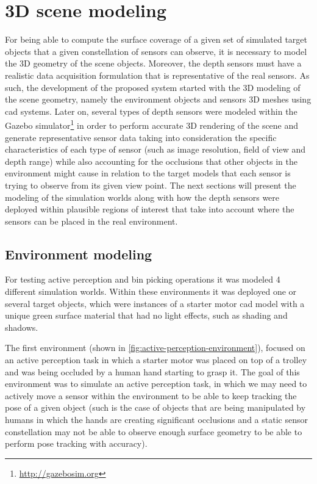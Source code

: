\section{3D scene modeling}\label{sec:modeling}

For being able to compute the surface coverage of a given set of simulated target objects that a given constellation of sensors can observe, it is necessary to model the 3D geometry of the scene objects. Moreover, the depth sensors must have a realistic data acquisition formulation that is representative of the real sensors. As such, the development of the proposed system started with the 3D modeling of the scene geometry, namely the environment objects and sensors 3D meshes using \gls{cad} systems. Later on, several types of depth sensors were modeled within the Gazebo simulator\footnote{\url{http://gazebosim.org}} in order to perform accurate 3D rendering of the scene and generate representative sensor data taking into consideration the specific characteristics of each type of sensor (such as image resolution, field of view and depth range) while also accounting for the occlusions that other objects in the environment might cause in relation to the target models that each sensor is trying to observe from its given view point. The next sections will present the modeling of the simulation worlds along with how the depth sensors were deployed within plausible regions of interest that take into account where the sensors can be placed in the real environment.


\subsection{Environment modeling}

For testing active perception and bin picking operations it was modeled 4 different simulation worlds. Within these environments it was deployed one or several target objects, which were instances of a starter motor \gls{cad} model with a unique green surface material that had no light effects, such as shading and shadows.

The first environment (shown in \cref{fig:active-perception-environment}), focused on an active perception task in which a starter motor was placed on top of a trolley and was being occluded by a human hand starting to grasp it. The goal of this environment was to simulate an active perception task, in which we may need to actively move a sensor within the environment to be able to keep tracking the pose of a given object (such is the case of objects that are being manipulated by humans in which the hands are creating significant occlusions and a static sensor constellation may not be able to observe enough surface geometry to be able to perform pose tracking with accuracy).

